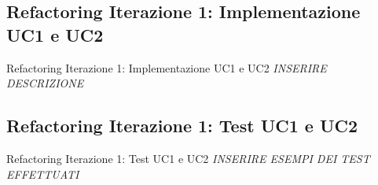 \subsection{Refactoring Iterazione 1: Implementazione UC1 e UC2}
\begin{frame} {Refactoring Iterazione 1: Implementazione UC1 e UC2}
 \emph{INSERIRE DESCRIZIONE}
\end{frame}

\subsection {Refactoring Iterazione 1: Test UC1 e UC2}
\begin{frame}[allowframebreaks] {Refactoring Iterazione 1: Test UC1 e UC2}
 \emph{INSERIRE ESEMPI DEI TEST EFFETTUATI}
   
\end{frame}


